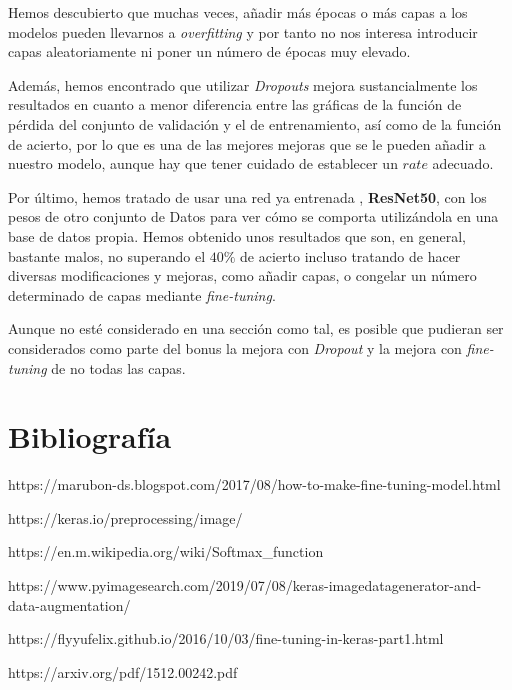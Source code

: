 \documentclass[11pt]{article}
\begin{document}
Hemos descubierto que muchas veces, añadir más épocas o más capas a los
modelos pueden llevarnos a \emph{overfitting} y por tanto no nos
interesa introducir capas aleatoriamente ni poner un número de épocas
muy elevado.

Además, hemos encontrado que utilizar \emph{Dropouts} mejora
sustancialmente los resultados en cuanto a menor diferencia entre las
gráficas de la función de pérdida del conjunto de validación y el de
entrenamiento, así como de la función de acierto, por lo que es una de
las mejores mejoras que se le pueden añadir a nuestro modelo, aunque hay
que tener cuidado de establecer un \(rate\) adecuado.

Por último, hemos tratado de usar una red ya entrenada ,
\textbf{ResNet50}, con los pesos de otro conjunto de Datos para ver cómo
se comporta utilizándola en una base de datos propia. Hemos obtenido
unos resultados que son, en general, bastante malos, no superando el
\(40\%\) de acierto incluso tratando de hacer diversas modificaciones y
mejoras, como añadir capas, o congelar un número determinado de capas
mediante \emph{fine-tuning}.

Aunque no esté considerado en una sección como tal, es posible que pudieran ser considerados como parte del bonus la mejora con \emph{Dropout} y la mejora con \emph{fine-tuning} de no todas las capas.

\hypertarget{bibliografuxeda}{%
\section{Bibliografía}\label{bibliografuxeda}}

https://marubon-ds.blogspot.com/2017/08/how-to-make-fine-tuning-model.html

https://keras.io/preprocessing/image/

https://en.m.wikipedia.org/wiki/Softmax\_function

https://www.pyimagesearch.com/2019/07/08/keras-imagedatagenerator-and-data-augmentation/

https://flyyufelix.github.io/2016/10/03/fine-tuning-in-keras-part1.html

https://arxiv.org/pdf/1512.00242.pdf


    
    
    
\end{document}
